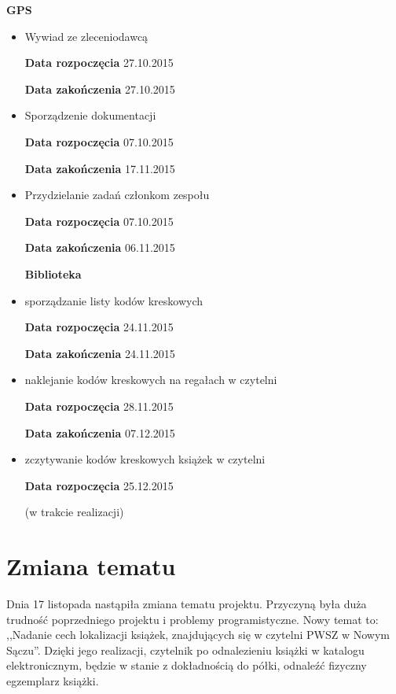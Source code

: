 \textbf{GPS}
\begin{itemize}

\item Wywiad ze zleceniodawcą

\textbf{Data rozpoczęcia} 27.10.2015

\textbf{Data zakończenia} 27.10.2015
\item Sporządzenie dokumentacji

\textbf{Data rozpoczęcia} 07.10.2015

\textbf{Data zakończenia} 17.11.2015

\item  Przydzielanie zadań członkom zespołu

\textbf{Data rozpoczęcia} 07.10.2015

\textbf{Data zakończenia} 06.11.2015

\textbf{Biblioteka}

\item sporządzanie listy kodów kreskowych

\textbf{Data rozpoczęcia} 24.11.2015

\textbf{Data zakończenia} 24.11.2015 



\item naklejanie kodów kreskowych na regałach  w czytelni

\textbf{Data rozpoczęcia} 28.11.2015

\textbf{Data zakończenia} 07.12.2015


\item zczytywanie kodów kreskowych książek w czytelni

\textbf{Data rozpoczęcia} 25.12.2015 

(w trakcie realizacji)


\end{itemize}

\section{Zmiana tematu}

Dnia 17 listopada nastąpiła zmiana tematu projektu. Przyczyną była duża trudność poprzedniego projektu i problemy programistyczne. Nowy temat to: ,,Nadanie cech lokalizacji książek,  znajdujących się w czytelni PWSZ w Nowym Sączu''. Dzięki jego realizacji, czytelnik po odnalezieniu książki w katalogu elektronicznym, będzie w stanie z dokładnością do półki, odnaleźć fizyczny egzemplarz książki. 

